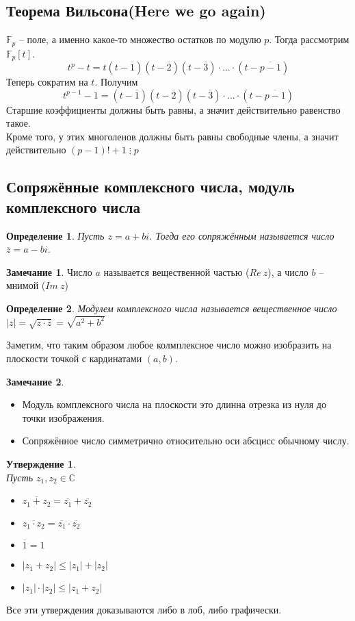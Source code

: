 \documentclass[12pt, a4paper]{article}
\newcommand{\ce}{\mathds{C}}
\newcommand{\m}{\leqslant}
\newcommand{\cl}[1]{\overline{#1}}
\newcommand{\de}{\;\vdots\;}
\theoremstyle{plain}
\newtheorem{Def}{Определение}
\newtheorem*{Statement*}{Утверждение}
\theoremstyle{definition}
\newtheorem*{Remark*}{Замечание}
\begin{document}
\subsection*{Теорема Вильсона(Here we go again)}
$\mathds{F}_p$ -- поле, а именно какое-то множество остатков по модулю $p$. Тогда рассмотрим $\mathds{F}_p[t]$.
\\
\[t^p-t = t(t-\cl{1})(t - \cl{2})(t-\cl{3})\cdot...\cdot(t-\cl{p-1})\]
Теперь сократим на $t$. Получим
\[t^{p-1}-1 = (t-\cl{1})(t - \cl{2})(t-\cl{3})\cdot...\cdot(t-\cl{p-1})\]
Старшие коэффициенты должны быть равны, а значит действительно равенство такое.\\
Кроме того, у этих многоленов должны быть равны свободные члены, а значит действительно $(p-1)!+1\de p$
\subsection*{Сопряжённые комплексного числа, модуль комплексного числа}
\begin{Def}
    Пусть $z = a+bi$. Тогда его сопряжённым называется число $\cl{z} = a-bi$.
\end{Def}
\begin{Remark*}
    Число $a$ называется вещественной частью ($Re\ z$), а число $b$ -- мнимой ($Im \ z$)
\end{Remark*}
\begin{Def}
    Модулем комплексного числа называется вещественное число $|z| = \sqrt{z\cdot\cl{z}} = \sqrt{a^2+b^2}$
\end{Def}
\noindent Заметим, что таким образом любое колмплексное число можно изобразить на плоскости точкой с кардинатами $(a,b)$.
\begin{Remark*}\
    \begin{itemize}
        \item Модуль комплексного числа на плоскости это длинна отрезка из нуля до точки изображения.
        \item Сопряжённое число симметрично относительно оси абсцисс обычному числу.
    \end{itemize}
\end{Remark*}
\begin{Statement*}\ \\
    Пусть $z_1,z_2\in\ce$
    \begin{itemize}
        \item $\cl{z_1+z_2} = \cl{z_1}+\cl{z_2}$
        \item $\cl{z_1\cdot z_2} = \cl{z_1}\cdot \cl{z_2}$
        \item $\cl{1} = 1$
        \item $|z_1+z_2|\m |z_1|+|z_2|$
        \item $|z_1|\cdot|z_2|\m |z_1+z_2|$
    \end{itemize}
\end{Statement*}
\noindent Все эти утверждения доказываются либо в лоб, либо графически.
\end{document}

